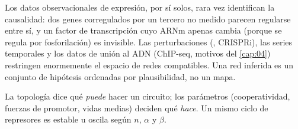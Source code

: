 \begin{cuidado}
Los datos observacionales de expresión, por sí solos, rara vez identifican la causalidad: dos genes corregulados por un tercero no medido parecen regularse entre sí, y un factor de transcripción cuyo ARNm apenas cambia (porque se regula por fosforilación) es invisible. Las perturbaciones (, CRISPRi), las series temporales y los datos de unión al ADN (ChIP-seq, motivos del \cref{cap:04}) restringen enormemente el espacio de redes compatibles. Una red inferida es un conjunto de hipótesis ordenadas por plausibilidad, no un mapa.
\end{cuidado}

\begin{ideaclave}
La topología dice qué \emph{puede} hacer un circuito; los parámetros (cooperatividad, fuerzas de promotor, vidas medias) deciden qué \emph{hace}. Un mismo ciclo de represores es estable u oscila según $n$, $\alpha$ y $\beta$.
\end{ideaclave}

